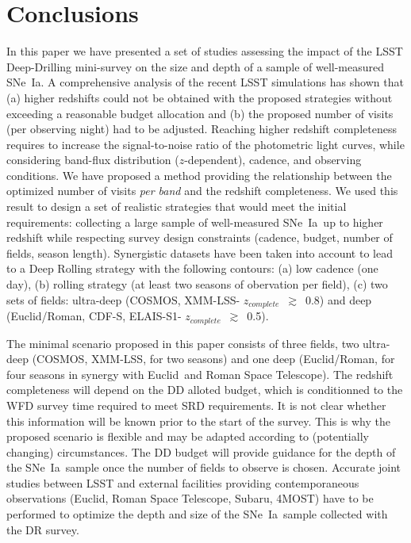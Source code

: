 \documentclass[skiphelvet,twocolumn]{aastex63}
\newcommand{\cosmos}{{COSMOS}}
\newcommand{\elais}{{ELAIS-S1}}
\newcommand{\xmm}{{XMM-LSS}}
\newcommand{\cdfs}{{CDF-S}}
\newcommand{\adfs}{{Euclid/Roman}}
\newcommand{\euclid}{{Euclid}}
\newcommand{\romanspace}{{Roman Space Telescope}}
\newcommand{\sne}{{SNe~Ia}}
\newcommand{\zcomp}{\mbox{$z_{complete}$}}
\begin{document}
\section{Conclusions}
\label{sec:conclusion}
In this paper we have presented a set of studies assessing the impact of the LSST Deep-Drilling mini-survey on the size and depth of a sample of well-measured \sne. A comprehensive analysis of the recent LSST simulations has shown that (a) higher redshifts could not be obtained with the proposed strategies without exceeding a reasonable budget allocation and (b) the proposed number of visits (per observing night) had to be adjusted. Reaching higher redshift completeness requires to increase the signal-to-noise ratio of the photometric light curves, while considering band-flux distribution ($z$-dependent), cadence, and observing conditions. We have proposed a method providing the relationship between the optimized number of visits {\it per band}  and the redshift completeness. We used this result to design a set of realistic strategies that would meet the initial requirements: collecting a large sample of well-measured \sne~up to higher redshift while respecting survey design constraints (cadence, budget, number of fields, season length). Synergistic datasets have been taken into account to lead to a Deep Rolling strategy with the following contours: (a) low cadence (one day), (b) rolling strategy (at least two seasons of obervation per field), (c) two sets of fields: ultra-deep (\cosmos, \xmm - \zcomp~$\gtrsim$~0.8) and deep (\adfs, \cdfs, \elais - \zcomp~$\gtrsim$~0.5).
\par
The minimal scenario proposed in this paper consists of three fields, two ultra-deep (\cosmos, \xmm, for two seasons) and one deep (\adfs, for four seasons in synergy with \euclid~and \romanspace). The redshift completeness will depend on the DD alloted budget, which is conditionned to the WFD survey time required to meet SRD requirements. It is not clear whether this information will be known prior to the start of the survey. This is why the proposed scenario is flexible and may be adapted according to (potentially changing) circumstances. The DD budget will provide guidance for the depth of the \sne~sample once the number of fields to observe is chosen. Accurate joint studies between LSST and external facilities providing contemporaneous observations (\euclid, \romanspace, Subaru, 4MOST) have to be performed to optimize the depth and size of the \sne~sample collected with the DR survey.
\end{document}
